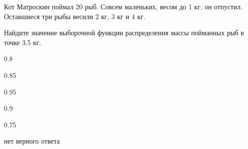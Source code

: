 
\begin{question}
Кот Матроскин поймал 20 рыб. Совсем маленьких, весом до 1 кг, он
отпустил. Оставшиеся три рыбы весили 2 кг, 3 кг и 4 кг.

Найдите значение выборочной функции распределения массы пойманных рыб в
точке 3.5 кг.
\begin{answerlist}
  \item 0.8
  \item 0.85
  \item 0.95
  \item 0.9
  \item 0.75
  \item нет верного ответа
\end{answerlist}
\end{question}


